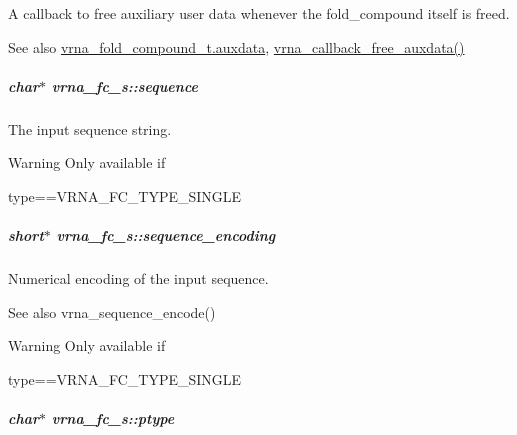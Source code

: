 A callback to free auxiliary user data whenever the fold\+\_\+compound itself is free\textquotesingle{}d. 

\begin{DoxySeeAlso}{See also}
\hyperlink{group__fold__compound_a20048e0c369e9f24b55423d600037c68}{vrna\+\_\+fold\+\_\+compound\+\_\+t.\+auxdata}, \hyperlink{group__fold__compound_ga3ae51bfd5fc3236652d1de4e3274b49b}{vrna\+\_\+callback\+\_\+free\+\_\+auxdata()} 
\end{DoxySeeAlso}
\subparagraph[{\texorpdfstring{sequence}{sequence}}]{\setlength{\rightskip}{0pt plus 5cm}char$\ast$ vrna\+\_\+fc\+\_\+s\+::sequence}\hypertarget{group__fold__compound_a87f6abcda89cfb7a486c97e1f5371525}{}\label{group__fold__compound_a87f6abcda89cfb7a486c97e1f5371525}


The input sequence string. 

\begin{DoxyWarning}{Warning}
Only available if\begin{DoxyVerb}type==VRNA_FC_TYPE_SINGLE \end{DoxyVerb}
 
\end{DoxyWarning}
\subparagraph[{\texorpdfstring{sequence\+\_\+encoding}{sequence_encoding}}]{\setlength{\rightskip}{0pt plus 5cm}short$\ast$ vrna\+\_\+fc\+\_\+s\+::sequence\+\_\+encoding}\hypertarget{group__fold__compound_a9934bdb695d35a3544285cbcc19f9763}{}\label{group__fold__compound_a9934bdb695d35a3544285cbcc19f9763}


Numerical encoding of the input sequence. 

\begin{DoxySeeAlso}{See also}
vrna\+\_\+sequence\+\_\+encode() 
\end{DoxySeeAlso}
\begin{DoxyWarning}{Warning}
Only available if\begin{DoxyVerb}type==VRNA_FC_TYPE_SINGLE \end{DoxyVerb}
 
\end{DoxyWarning}
\subparagraph[{\texorpdfstring{ptype}{ptype}}]{\setlength{\rightskip}{0pt plus 5cm}char$\ast$ vrna\+\_\+fc\+\_\+s\+::ptype}\hypertarget{group__fold__compound_a3fbea559f1d1976b2d67c215cdeee0b2}{}\label{group__fold__compound_a3fbea559f1d1976b2d67c215cdeee0b2}


